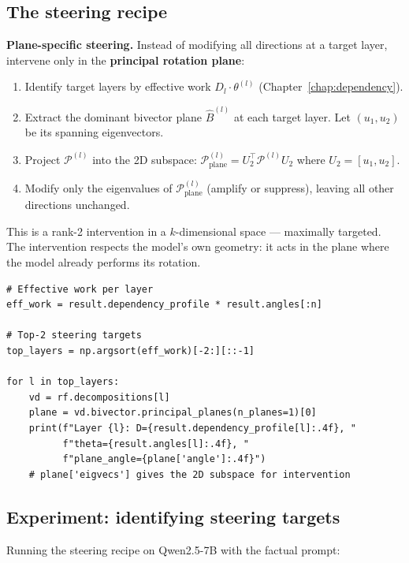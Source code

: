 \documentclass[11pt, twoside, openright]{memoir}
\newcommand{\metric}[1]{\mathcal{P}^{(#1)}} %
\begin{document}
\subsection{The steering recipe}

\begin{keyidea}
\textbf{Plane-specific steering.}
Instead of modifying all directions at a target layer, intervene only
in the \textbf{principal rotation plane}:
\begin{enumerate}[nosep]
\item Identify target layers by effective work $D_l \cdot \theta^{(l)}$
  (Chapter~\ref{chap:dependency}).
\item Extract the dominant bivector plane $\hat{B}^{(l)}$ at each
  target layer.  Let $(u_1, u_2)$ be its spanning eigenvectors.
\item Project $\metric{l}$ into the 2D subspace:
  $\metric{l}_{\text{plane}} = U_2^\top \metric{l} U_2$ where
  $U_2 = [u_1, u_2]$.
\item Modify only the eigenvalues of $\metric{l}_{\text{plane}}$
  (amplify or suppress), leaving all other directions unchanged.
\end{enumerate}
This is a rank-2 intervention in a $k$-dimensional space --- maximally
targeted.  The intervention respects the model's own geometry: it acts
in the plane where the model already performs its rotation.
\end{keyidea}

\begin{lstlisting}[caption={Identifying steering targets}]
# Effective work per layer
eff_work = result.dependency_profile * result.angles[:n]

# Top-2 steering targets
top_layers = np.argsort(eff_work)[-2:][::-1]

for l in top_layers:
    vd = rf.decompositions[l]
    plane = vd.bivector.principal_planes(n_planes=1)[0]
    print(f"Layer {l}: D={result.dependency_profile[l]:.4f}, "
          f"theta={result.angles[l]:.4f}, "
          f"plane_angle={plane['angle']:.4f}")
    # plane['eigvecs'] gives the 2D subspace for intervention
\end{lstlisting}

\subsection{Experiment: identifying steering targets}

Running the steering recipe on Qwen2.5-7B with the factual prompt:
\end{document}
